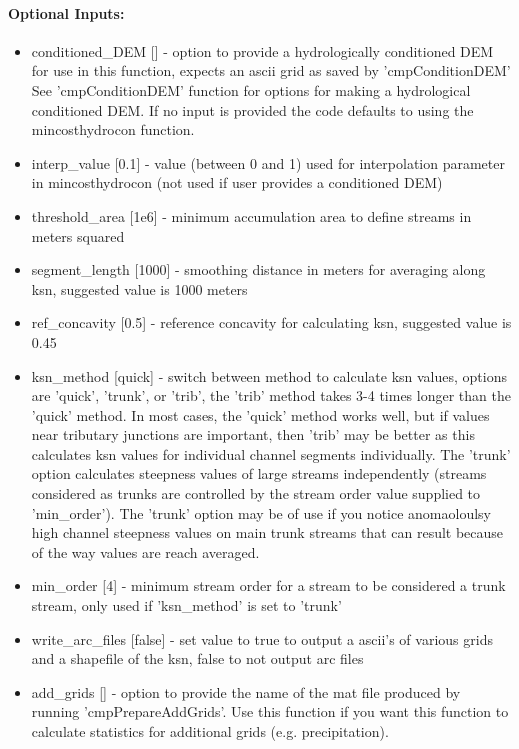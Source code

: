 \paragraph{Optional Inputs:}
\begin{itemize}
\item conditioned\_DEM [] - option to provide a hydrologically conditioned DEM for use in this function, expects an ascii grid as saved by 'cmpConditionDEM'
See 'cmpConditionDEM' function for options for making a hydrological conditioned DEM. If no input is provided the code defaults to using the 
mincosthydrocon function.
\item interp\_value [0.1] - value (between 0 and 1) used for interpolation parameter in mincosthydrocon (not used if user provides a conditioned DEM)
\item threshold\_area [1e6] - minimum accumulation area to define streams in meters squared
\item segment\_length [1000] - smoothing distance in meters for averaging along ksn, suggested value is 1000 meters
\item ref\_concavity [0.5] - reference concavity for calculating ksn, suggested value is 0.45
\item ksn\_method [quick] - switch between method to calculate ksn values, options are 'quick', 'trunk', or 'trib', the 'trib' method takes 3-4 times longer 
than the 'quick' method. In most cases, the 'quick' method works well, but if values near tributary junctions are important, then 'trib'
may be better as this calculates ksn values for individual channel segments individually. The 'trunk' option calculates steepness values
of large streams independently (streams considered as trunks are controlled by the stream order value supplied to 'min\_order'). The 'trunk' option
may be of use if you notice anomaoloulsy high channel steepness values on main trunk streams that can result because of the way values are reach
averaged.
\item min\_order [4] - minimum stream order for a stream to be considered a trunk stream, only used if 'ksn\_method' is set to 'trunk'
\item write\_arc\_files [false] - set value to true to output a ascii's of various grids and a shapefile of the ksn, false to not output arc files
\item add\_grids [] - option to provide the name of the mat file produced by running 'cmpPrepareAddGrids'. Use this function if you want this function 
to calculate statistics for additional grids (e.g. precipitation).

\end{itemize}
